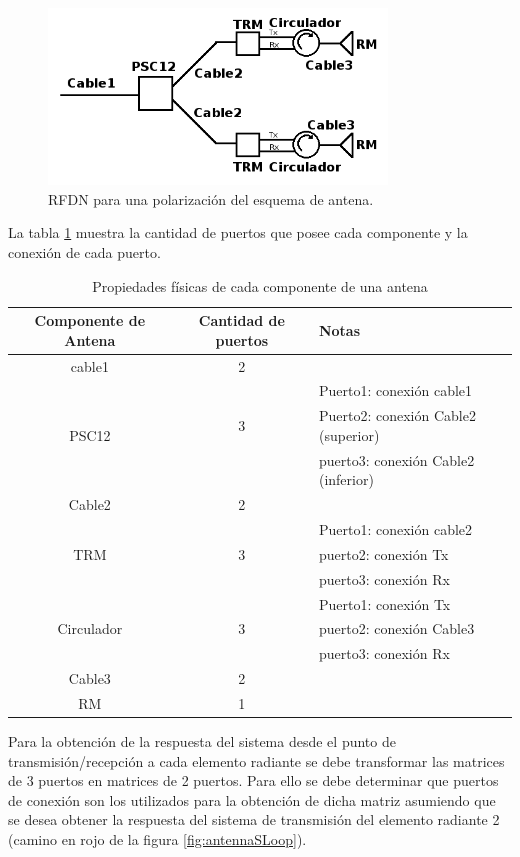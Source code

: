 \begin{figure}[H]
 \centering
 \includegraphics[width=9cm]{gfx/RFDN.png}
 \caption{RFDN para una polarización del esquema de antena.}
 \label{fig:antennaS}
\end{figure}

La tabla \ref{tab:componentSParameters} muestra la cantidad de puertos que posee cada componente y la conexión de cada puerto.

\begin{table}[H]
  \footnotesize
  \centering
  \begin{tabular}{|c|c|p{6cm}|}
	\hline
	\textbf{Componente de Antena} & \textbf{Cantidad de puertos} & \textbf{Notas} \tabularnewline \hline
	cable1 &  2 & \tabularnewline \hline
	\multirow{3}{*}{PSC12} & & Puerto1: conexión cable1 \tabularnewline
	 & 3 & Puerto2: conexión Cable2 (superior) \tabularnewline
	 & & puerto3: conexión Cable2 (inferior) \tabularnewline \hline
	Cable2 & 2 & \tabularnewline \hline
	\multirow{3}{*}{TRM} & & Puerto1: conexión cable2 \tabularnewline
	 & 3 & puerto2: conexión Tx \tabularnewline
	 & & puerto3: conexión Rx \tabularnewline \hline
	\multirow{3}{*}{Circulador} & & Puerto1: conexión Tx \tabularnewline
	 & 3 & puerto2: conexión Cable3 \tabularnewline
	 & & puerto3: conexión Rx \tabularnewline \hline
	Cable3 & 2 & \tabularnewline \hline
	RM & 1 & \tabularnewline \hline
  \end{tabular}
  \caption{Propiedades físicas de cada componente de una antena}
  \label{tab:componentSParameters}
\end{table}

Para la obtención de la respuesta del sistema desde el punto de transmisión/recepción a cada elemento radiante se debe
transformar las matrices de 3 puertos en matrices de 2 puertos. Para ello se debe determinar que puertos de conexión son los
utilizados para la obtención de dicha matriz asumiendo que se desea obtener la respuesta del sistema de transmisión del
elemento radiante 2 (camino en rojo de la figura \ref{fig:antennaSLoop}).

